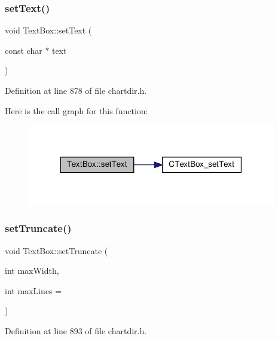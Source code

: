 \subsubsection{\texorpdfstring{set\+Text()}{setText()}}
{\footnotesize\ttfamily void Text\+Box\+::set\+Text (\begin{DoxyParamCaption}\item[{const char $\ast$}]{text }\end{DoxyParamCaption})\hspace{0.3cm}{\ttfamily [inline]}}



Definition at line 878 of file chartdir.\+h.

Here is the call graph for this function\+:
\nopagebreak
\begin{figure}[H]
\begin{center}
\leavevmode
\includegraphics[width=307pt]{class_text_box_a29307e42860b1de681bbf02e58c1ee8e_cgraph}
\end{center}
\end{figure}
\mbox{\label{class_text_box_a71d706a7ad9cda1093c03090e14563e9}} 
\subsubsection{\texorpdfstring{set\+Truncate()}{setTruncate()}}
{\footnotesize\ttfamily void Text\+Box\+::set\+Truncate (\begin{DoxyParamCaption}\item[{int}]{max\+Width,  }\item[{int}]{max\+Lines = {} }\end{DoxyParamCaption})\hspace{0.3cm}{\ttfamily [inline]}}



Definition at line 893 of file chartdir.\+h.

